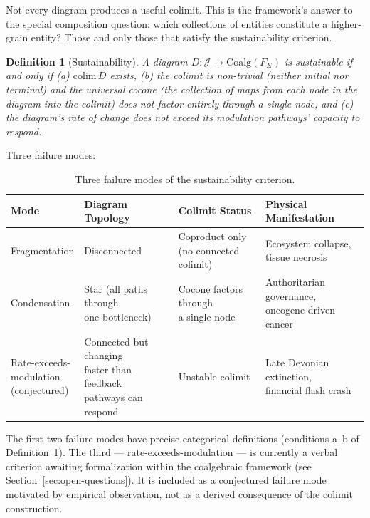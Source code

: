 \documentclass[12pt,a4paper]{article}
\newtheorem{definition}{Definition}
\begin{document}
Not every diagram produces a useful colimit. This is the framework's answer to the special composition question: which collections of entities constitute a higher-grain entity? Those and only those that satisfy the sustainability criterion.

\begin{definition}[Sustainability]
\label{def:sustainability}
A diagram $D : \mathcal{J} \to \text{Coalg}(F_\Sigma)$ is \emph{sustainable} if and only if (a) $\text{colim}\, D$ exists, (b) the colimit is non-trivial (neither initial nor terminal) and the universal cocone (the collection of maps from each node in the diagram into the colimit) does not factor entirely through a single node, and (c) the diagram's rate of change does not exceed its modulation pathways' capacity to respond.
\end{definition}

Three failure modes:

\begin{table}[htbp]
\centering
\begin{tabular}{@{}llll@{}}
\toprule
Mode & Diagram Topology & Colimit Status & Physical Manifestation \\
\midrule
Fragmentation & Disconnected & \makecell[l]{Coproduct only \\ (no connected colimit)} & \makecell[l]{Ecosystem collapse, \\ tissue necrosis} \\[6pt]
Condensation & \makecell[l]{Star (all paths through \\ one bottleneck)} & \makecell[l]{Cocone factors through \\ a single node} & \makecell[l]{Authoritarian governance, \\ oncogene-driven cancer} \\[6pt]
\makecell[l]{Rate-exceeds- \\ modulation \\ (conjectured)} & \makecell[l]{Connected but changing \\ faster than feedback \\ pathways can respond} & Unstable colimit & \makecell[l]{Late Devonian extinction, \\ financial flash crash} \\
\bottomrule
\end{tabular}
\caption{Three failure modes of the sustainability criterion.}
\label{tab:failure-modes}
\end{table}

The first two failure modes have precise categorical definitions (conditions a--b of Definition~\ref{def:sustainability}). The third --- rate-exceeds-modulation --- is currently a verbal criterion awaiting formalization within the coalgebraic framework (see Section~\ref{sec:open-questions}). It is included as a conjectured failure mode motivated by empirical observation, not as a derived consequence of the colimit construction.
\end{document}
